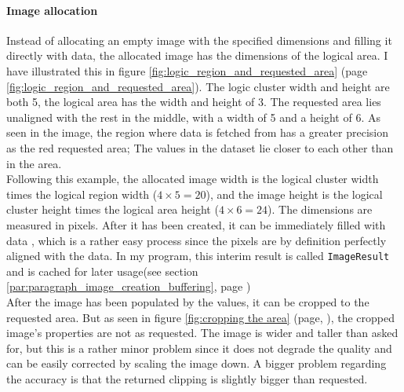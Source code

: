 \documentclass[10pt,a4paper,titlepage]{article}
\begin{document}
	\paragraph{Image allocation}
	Instead of allocating an empty image with the specified dimensions and filling it directly with data, the allocated image has the dimensions of the logical area. I have illustrated this in figure \ref{fig:logic_region_and_requested_area} (page \ref{fig:logic_region_and_requested_area}). The logic cluster width and height are both 5, the logical area has the width and height of 3. The requested area lies unaligned with the rest in the middle, with a width of 5 and a height of 6. As seen in the image, the region where data is fetched from has a greater precision as the red requested area; The values in the dataset lie closer to each other than in the area.\\
	Following this example, the allocated image width is the logical cluster width times the logical region width (\(4 \times 5 = 20\)), and the image height is the logical cluster height times the logical area height (\(4 \times 6 = 24\)). The dimensions are measured in pixels. After it has been created, it can be immediately filled with data , which is a rather easy process since the pixels are by definition perfectly aligned with the data. In my program, this interim result is called \verb|ImageResult| and is cached for later usage(see section \ref{par:paragraph_image_creation_buffering}, page \pageref{par:paragraph_image_creation_buffering}) \\
	After the image has been populated by the values, it can be cropped to the requested area. But as seen in figure \ref{fig:cropping the area} (page, \pageref{fig:cropping the area}), the cropped image's properties are not as requested. The image is wider and taller than asked for, but this is a rather minor problem since it does not degrade the quality and can be easily corrected by scaling the image down. A bigger problem regarding the accuracy is that the returned clipping is slightly bigger than requested.
	
\end{document}
